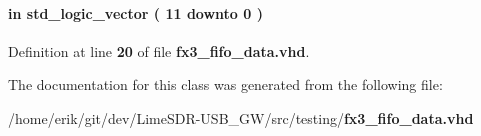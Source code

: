 \paragraph[{wrusedw}]{ {\bfseries \textcolor{keywordflow}{in}\textcolor{vhdlchar}{ }} {\bfseries \textcolor{comment}{std\+\_\+logic\+\_\+vector}\textcolor{vhdlchar}{ }\textcolor{vhdlchar}{(}\textcolor{vhdlchar}{ }\textcolor{vhdlchar}{ } \textcolor{vhdldigit}{11} \textcolor{vhdlchar}{ }\textcolor{keywordflow}{downto}\textcolor{vhdlchar}{ }\textcolor{vhdlchar}{ } \textcolor{vhdldigit}{0} \textcolor{vhdlchar}{ }\textcolor{vhdlchar}{)}\textcolor{vhdlchar}{ }} \hspace{0.3cm}{\ttfamily [Port]}}\label{classfx3__fifo__data_a3fea1eaafa7be8d01443953540049374}


Definition at line {\bf 20} of file {\bf fx3\+\_\+fifo\+\_\+data.\+vhd}.



The documentation for this class was generated from the following file\+:\begin{DoxyCompactItemize}
\item 
/home/erik/git/dev/\+Lime\+S\+D\+R-\/\+U\+S\+B\+\_\+\+G\+W/src/testing/{\bf fx3\+\_\+fifo\+\_\+data.\+vhd}\end{DoxyCompactItemize}

